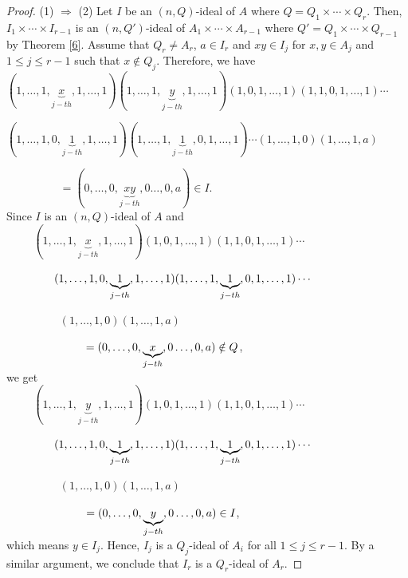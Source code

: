 \documentclass[preprint,review,10pt]{amsart}
\theoremstyle{definition}
\theoremstyle{remark}
\numberwithin{equation}{section}
\begin{document}
 \begin{proof}
(1) $\Longrightarrow$ (2) Let $I$ be an $(n,Q)$-ideal of $A$ where $Q =Q_1 \times \cdots \times Q_{r}$. Then, $I_1  \times \cdots \times I_{r-1}$ is an $(n,Q')$-ideal of $A_1 \times   \cdots \times A_{r-1}$ where $Q'=Q_1 \times \cdots \times Q_{r-1}$ by  Theorem \ref{6}.  Assume that $Q_r \neq A_r$, $a \in I_r$ and $xy \in I_j $ for $x,y \in A_j$ and $1 \leq j \leq r-1$ such that $x \notin Q_j$. Therefore, we have \\
 
 $(1,\ldots,1,\underbrace{x}_{j-th},1,\ldots,1)(1,\ldots,1,\underbrace{y}_{j-th},1,\ldots,1)(1,0,1,\ldots,1)(1,1,0,1,\ldots,1) \cdots $
 
 $(1,\ldots,1,0,\underbrace{1}_{j-th},1,\ldots,1)(1,\ldots,1,\underbrace{1}_{j-th},0,1,\ldots,1)\cdots(1,\ldots,1,0)(1,\ldots,1,a)$
 
 $\hspace{2cm}=(0,\ldots,0, \underbrace{xy}_{j-th},0\ldots,0,a) \in  I.$\\
 
  Since $I$ is an $(n,Q)$-ideal of $A$ and  \\
  
   $\hspace{1cm}(1,\ldots,1,\underbrace{x}_{j-th},1,\ldots,1)(1,0,1,\ldots,1)(1,1,0,1,\ldots,1) \cdots $
 
 $\hspace{1.5cm}(1,\ldots,1,0,\underbrace{1}_{j-th},1,\ldots,1)(1,\ldots,1,\underbrace{1}_{j-th},0,1,\ldots,1)\cdots$
 
 $\hspace{2cm}(1,\ldots,1,0)(1,\ldots,1,a) $
 
 $\hspace{2.5cm}=(0,\ldots,0, \underbrace{x}_{j-th},0\ldots,0,a) \notin  Q$,\\
 
   we get\\
 
 $\hspace{1cm}(1,\ldots,1,\underbrace{y}_{j-th},1,\ldots,1)(1,0,1,\ldots,1)(1,1,0,1,\ldots,1) \cdots $
 
 $\hspace{1.5cm}(1,\ldots,1,0,\underbrace{1}_{j-th},1,\ldots,1)(1,\ldots,1,\underbrace{1}_{j-th},0,1,\ldots,1)\cdots$
 
 $\hspace{2cm}(1,\ldots,1,0)(1,\ldots,1,a) $
 
 $\hspace{2.5cm}=(0,\ldots,0, \underbrace{y}_{j-th},0\ldots,0,a) \in I$,\\
 which means $y \in I_j$. Hence, $I_j$ is a $Q_j$-ideal of $A_i$ for all $1 \leq j \leq r-1$. By a similar argument, we conclude that $I_r$ is a $Q_r$-ideal of $A_r$.
 

\end{proof}
\end{document}
